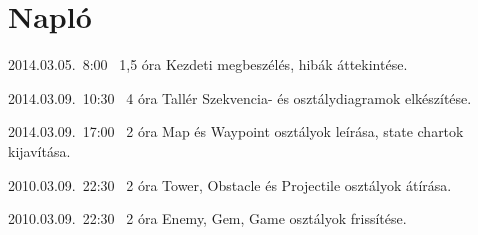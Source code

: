 %
\section{Napló}

\begin{naplo}


\bejegyzes
{2014.03.05.~8:00~} %
{1,5 óra} %
{\vadam\newline
\vantal\newline
\vbator\newline
\vtorok} %
{Kezdeti megbeszélés, hibák áttekintése.} %

\bejegyzes
{2014.03.09.~10:30~} %
{4 óra} %
{Tallér} %
{Szekvencia- és osztálydiagramok elkészítése.}

\bejegyzes
{2014.03.09.~17:00~}
{2 óra}
{\vadam}
{Map és Waypoint osztályok leírása, state chartok kijavítása.}

\bejegyzes
{2010.03.09.~22:30~}
{2 óra}
{\vadam}
{Tower, Obstacle és Projectile osztályok átírása.}

\bejegyzes
{2010.03.09.~22:30~}
{2 óra}
{\vantal}
{Enemy, Gem, Game osztályok frissítése.}

\end{naplo}

